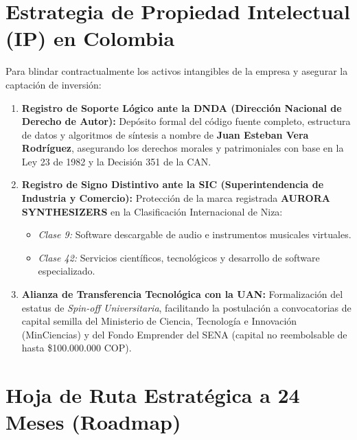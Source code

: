 \documentclass[11pt,a4paper]{article}
\begin{document}
\section{Estrategia de Propiedad Intelectual (IP) en Colombia}

Para blindar contractualmente los activos intangibles de la empresa y asegurar la captación de inversión:

\begin{enumerate}[leftmargin=1.5cm]
    \item \textbf{Registro de Soporte Lógico ante la DNDA (Dirección Nacional de Derecho de Autor):}
    Depósito formal del código fuente completo, estructura de datos y algoritmos de síntesis a nombre de \textbf{Juan Esteban Vera Rodríguez}, asegurando los derechos morales y patrimoniales con base en la Ley 23 de 1982 y la Decisión 351 de la CAN.
    \item \textbf{Registro de Signo Distintivo ante la SIC (Superintendencia de Industria y Comercio):}
    Protección de la marca registrada \textbf{AURORA SYNTHESIZERS} en la Clasificación Internacional de Niza:
    \begin{itemize}
        \item \textit{Clase 9:} Software descargable de audio e instrumentos musicales virtuales.
        \item \textit{Clase 42:} Servicios científicos, tecnológicos y desarrollo de software especializado.
    \end{itemize}
    \item \textbf{Alianza de Transferencia Tecnológica con la UAN:}
    Formalización del estatus de \textit{Spin-off Universitaria}, facilitando la postulación a convocatorias de capital semilla del Ministerio de Ciencia, Tecnología e Innovación (MinCiencias) y del Fondo Emprender del SENA (capital no reembolsable de hasta \$100.000.000 COP).
\end{enumerate}

\section{Hoja de Ruta Estratégica a 24 Meses (Roadmap)}
\end{document}

